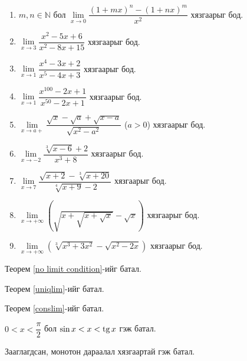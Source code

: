 \begin{description}
\begin{enumerate}
\item $m,n\in\mathbb{N}$ бол $\lim\limits _{x\to 0} \dfrac{(1+mx)^n-(1+nx)^m}{x^2}$ хязгаарыг бод.
\item $\lim\limits _{x\to 3} \dfrac{x^2-5x+6}{x^2-8x+15}$ хязгаарыг бод.
\item $\lim\limits _{x\to 1} \dfrac{x^4-3x+2}{x^5-4x+3}$ хязгаарыг бод.
\item $\lim\limits _{x\to 1} \dfrac{x^{100}-2x+1}{x^{50}-2x+1}$ хязгаарыг бод.
\item $\lim\limits _{x\to a+} \dfrac{\sqrt{x}-\sqrt{a}+\sqrt{x-a}}{\sqrt{x^2-a^2}}$ ($a>0$) хязгаарыг бод.
\item $\lim\limits _{x\to-2} \dfrac{\sqrt[3]{x-6}+2}{x^3+8}$ хязгаарыг бод.
\item $\lim\limits _{x\to 7} \dfrac{\sqrt{x+2}-\sqrt[3]{x+20}}{\sqrt[4]{x+9}-2}$ хязгаарыг бод.
\item $\lim\limits _{x\to +\infty} \left(\sqrt{x+\sqrt{x+\sqrt{x}}}-\sqrt{x}\right)$ хязгаарыг бод.
\item $\lim\limits _{x\to +\infty} \left(\sqrt[3]{x^3+3x^2}-\sqrt{x^2-2x}\right)$ хязгаарыг бод.
\end{enumerate}
\item[C] Теорем \ref{no limit condition}-ийг батал.
\item[D] Теорем \ref{uniqlim}-ийг батал.
\item[E] Теорем \ref{conslim}-ийг батал.
\item[F] $0<x<\dfrac{\pi}{2}$ бол $\sin x<x<\operatorname{tg} x$ гэж батал.
\item[G] Зааглагдсан, монотон дараалал хязгаартай гэж батал.
\end{description}

